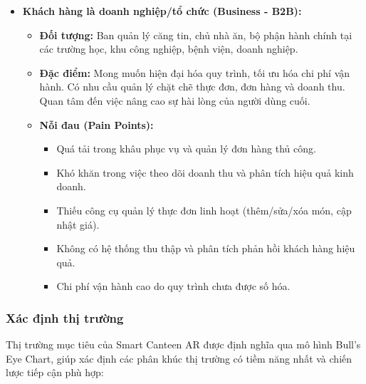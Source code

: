 \documentclass[12pt,a4paper]{article}
\begin{document}
\begin{itemize}[label=\textbullet]
    \item \textbf{Khách hàng là doanh nghiệp/tổ chức (Business - B2B):}
    \begin{itemize}[label=\textendash]
        \item \textbf{Đối tượng:} Ban quản lý căng tin, chủ nhà ăn, bộ phận hành chính tại các trường học, khu công nghiệp, bệnh viện, doanh nghiệp.
        \item \textbf{Đặc điểm:} Mong muốn hiện đại hóa quy trình, tối ưu hóa chi phí vận hành. Có nhu cầu quản lý chặt chẽ thực đơn, đơn hàng và doanh thu. Quan tâm đến việc nâng cao sự hài lòng của người dùng cuối.
        \item \textbf{Nỗi đau (Pain Points):}
        \begin{itemize}[label=\textrightarrow]
            \item Quá tải trong khâu phục vụ và quản lý đơn hàng thủ công.
            \item Khó khăn trong việc theo dõi doanh thu và phân tích hiệu quả kinh doanh.
            \item Thiếu công cụ quản lý thực đơn linh hoạt (thêm/sửa/xóa món, cập nhật giá).
            \item Không có hệ thống thu thập và phân tích phản hồi khách hàng hiệu quả.
            \item Chi phí vận hành cao do quy trình chưa được số hóa.
        \end{itemize}
    \end{itemize}
\end{itemize}

\subsubsection{Xác định thị trường}
Thị trường mục tiêu của Smart Canteen AR được định nghĩa qua mô hình Bull's Eye Chart, giúp xác định các phân khúc thị trường có tiềm năng nhất và chiến lược tiếp cận phù hợp:
\end{document}
